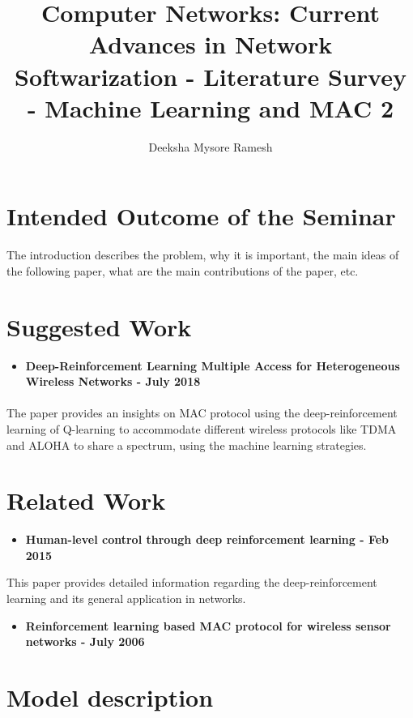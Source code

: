 \documentclass[12pt,twoside,doublepage]{article}
\newcommand{\teilnehmer}{Deeksha Mysore Ramesh}
\newcommand{\ausarbeitung}{Computer Networks: Current Advances in Network Softwarization - Literature Survey - Machine Learning and MAC 2 }
\begin{document}
\title{\ausarbeitung}
\author{\teilnehmer}
\maketitle
\thispagestyle{empty}






\section{Intended Outcome of the Seminar}
\label{sec:introduction}

The introduction describes the problem, why it is important, the main
ideas of the following paper, what are the main contributions of the
paper, etc. 

\section{Suggested Work}
\begin{itemize}
	\item \textbf{Deep-Reinforcement Learning Multiple Access for Heterogeneous Wireless Networks - July 2018 \cite{yu2019deep}}
\end{itemize}
 \paragraph{} The paper provides an insights on MAC protocol using the deep-reinforcement learning of Q-learning to accommodate different wireless protocols like TDMA and ALOHA to share a spectrum, using the machine learning strategies.

\label{sec:suggwork}

\section{Related Work}
\label{sec:relwork}
\begin{itemize}
	\item \textbf{Human-level control through deep reinforcement learning - Feb 2015 \cite{mnih2015human}}
	
\end{itemize}
This paper provides detailed information regarding the deep-reinforcement learning and its general application in networks.

\begin{itemize}
	\item \textbf{Reinforcement learning based MAC protocol for wireless sensor networks - July 2006 }
\end{itemize}
\paragraph{}

\section{Model description}
\label{sec:model}



\end{document}
